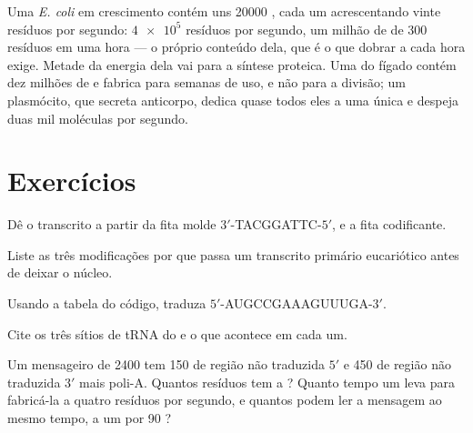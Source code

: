 \begin{example}\label{ex:b1:gene-expression:numbers}
Uma \emph{E. coli} em crescimento contém uns \num{20000} ,
cada um acrescentando vinte resíduos por segundo: $\num{4e5}$ resíduos
por segundo, um milhão de  de \qty{300}{} resíduos em uma hora
--- o próprio conteúdo dela, que é o que dobrar a cada hora exige.
Metade da energia dela vai para a síntese proteica. Uma  do fígado
contém dez milhões de  e fabrica  para semanas de
uso, e não para a divisão; um plasmócito, que secreta anticorpo, dedica
quase todos eles a uma única  e despeja duas mil moléculas por
segundo.
\end{example}

\section{Exercícios}

\begin{exercise}[$\star$]\label{exo:b1:gene-expression:1}
Dê o  transcrito a partir da fita molde $3'$-TACGGATTC-$5'$, e a fita
codificante.
\end{exercise}

\begin{exercise}[$\star$]\label{exo:b1:gene-expression:2}
Liste as três modificações por que passa um transcrito primário
eucariótico antes de deixar o núcleo.
\end{exercise}

\begin{exercise}[$\star$]\label{exo:b1:gene-expression:3}
Usando a tabela do código, traduza $5'$-AUGCCGAAAGUUUGA-$3'$.
\end{exercise}

\begin{exercise}[$\star$]\label{exo:b1:gene-expression:4}
Cite os três sítios de tRNA do  e o que acontece em cada um.
\end{exercise}

\begin{exercise}[$\star\star$]\label{exo:b1:gene-expression:5}
Um mensageiro de \qty{2400}{}  tem \qty{150}{} de região não
traduzida $5'$ e \qty{450}{} de região não traduzida $3'$ mais poli-A.
Quantos resíduos tem a ? Quanto tempo um  leva para
fabricá-la a quatro resíduos por segundo, e quantos  podem ler
a mensagem ao mesmo tempo, a um por \qty{90}{} ?
\end{exercise}

